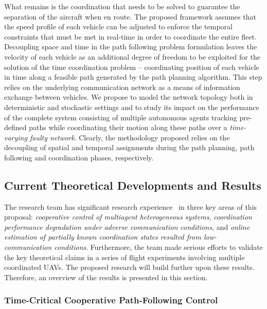 \documentclass[letter,onecolumn,12pt]{aiaa-tc}
\newcommand{\1}{1_n}
\begin{document}
What remains is the coordination that needs to be solved to guarantee the separation of the aircraft when en route. The proposed framework assumes that the speed profile of each vehicle can be adjusted to enforce the temporal constraints that must be met in real-time in order to coordinate the entire fleet. Decoupling space and time in the path following problem formulation leaves the velocity of each  vehicle as an additional  degree of freedom to be exploited for the solution of the time coordination problem -- coordinating position of each vehicle in time along a feasible path generated by the path planning algorithm.  This step relies on the underlying communication network as a means of information exchange between vehicles. We propose to model the network topology both in deterministic and stochastic settings and to study its impact on the performance of the complete system consisting of multiple autonomous agents tracking pre-defined paths while coordinating their motion along these paths over a \emph{ time-varying faulty network}. Clearly, the methodology proposed relies on the decoupling of spatial and temporal assignments during the path planning, path following and coordination phases, respectively.

\subsection{Current Theoretical Developments and Results}
\label{subsec:current_develop}

The research team has significant research experience~\cite{SM12_CPF} in three key areas of this proposal: \emph{cooperative control of multiagent heterogeneous systems}, \emph{coordination performance degradation under adverse communication conditions}, and \emph{online estimation of partially known coordination states resulted from low-communication conditions}. Furthermore, the team made serious efforts to validate the key theoretical claims in a series of flight experiments involving multiple coordinated UAVs. The proposed research will build further upon these results. Therefore, an overview of the results is presented in this section.

\subsubsection{Time-Critical Cooperative Path-Following Control}
\end{document}
